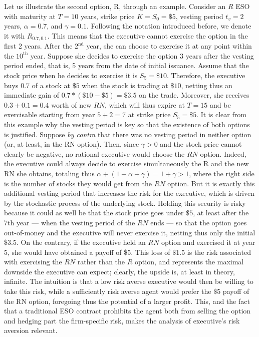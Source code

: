 Let us illustrate the second option, R, through an example. Consider an $R$ ESO with maturity at $T=10$ years, strike price $K=S_0=\$5$, vesting period $t_v=2$ years, $\alpha = 0.7$, and $\gamma=0.1$. Following the notation introduced before, we denote it with $R_{0.7, 0.1}$. This means that the executive cannot exercise the option in the first 2 years. After the $2^{\text{nd}}$ year, she can choose to exercise it at any point within the $10^{\text{th}}$ year. Suppose she decides to exercise the option 3 years after the vesting period ended, that is, 5 years from the date of initial issuance. Assume that the stock price when he decides to exercise it is $S_5 = \$10$. Therefore, the executive buys $0.7$ of a stock at $\$5$ when the stock is trading at $\$10$, netting thus an immediate gain of $0.7*(\$10-\$5)=\$3.5$ on the trade. Moreover, she receives $0.3+0.1=0.4$ worth of new $RN$, which will thus expire at $T=15$ and be exercisable starting from year $5+2=7$ at strike price $S_5=\$5$. 
It is clear from this example why the vesting period is key so that the existence of both options is justified. Suppose \textit{by contra} that there was no vesting period in neither option (or, at least, in the RN option). Then, since $\gamma > 0$ and the stock price cannot clearly be negative, no rational executive would choose the $RN$ option. Indeed, the executive could always decide to exercise simultaneously the R and the new RN she obtains, totaling thus $\alpha + (1-\alpha+\gamma)=1+\gamma > 1$, where the right side is the number of stocks they would get from the $RN$ option. But it is exactly this additional vesting period that increases the risk for the executive, which is driven by the stochastic process of the underlying stock. Holding this security is risky because it could as well be that the stock price goes under $\$5$, at least after the 7th year --- when the vesting period of the $RN$ ends --- so that the option goes out-of-money and the executive will never exercise it, netting thus only the initial \$3.5. On the contrary, if the executive held an $RN$ option and exercised it at year 5, she would have obtained a payoff of \$5. This loss of $\$1.5$ is the risk associated with exercising the $RN$ rather than the $R$ option, and represents the maximal downside the executive can expect; clearly, the upside is, at least in theory, infinite. The intuition is that a low risk averse executive would then be willing to take this risk, while a sufficiently risk averse agent would prefer the \$5 payoff of the RN option, foregoing thus the potential of a larger profit. 
This, and the fact that a traditional ESO contract prohibits the agent both from selling the option and hedging part the firm-specific risk, makes the analysis of executive's risk aversion relevant.

